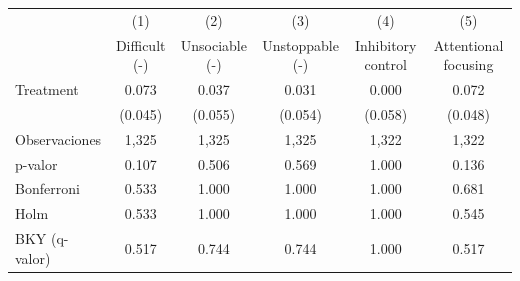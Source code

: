 {
\def\sym#1{\ifmmode^{#1}\else\(^{#1}\)\fi}
\begin{tabular}{l*{5}{c}}
\toprule
                    &\multicolumn{1}{c}{(1)}&\multicolumn{1}{c}{(2)}&\multicolumn{1}{c}{(3)}&\multicolumn{1}{c}{(4)}&\multicolumn{1}{c}{(5)}\\
                    &\multicolumn{1}{c}{Difficult (-)}&\multicolumn{1}{c}{Unsociable (-)}&\multicolumn{1}{c}{Unstoppable (-)}&\multicolumn{1}{c}{Inhibitory control}&\multicolumn{1}{c}{Attentional focusing}\\
\midrule
Treatment           &       0.073         &       0.037         &       0.031         &       0.000         &       0.072         \\
                    &     (0.045)         &     (0.055)         &     (0.054)         &     (0.058)         &     (0.048)         \\
\midrule
Observaciones       &       1,325         &       1,325         &       1,325         &       1,322         &       1,322         \\
p-valor             &       0.107         &       0.506         &       0.569         &       1.000         &       0.136         \\
Bonferroni          &       0.533         &       1.000         &       1.000         &       1.000         &       0.681         \\
Holm                &       0.533         &       1.000         &       1.000         &       1.000         &       0.545         \\
BKY (q-valor)       &       0.517         &       0.744         &       0.744         &       1.000         &       0.517         \\
\bottomrule
\end{tabular}
}
